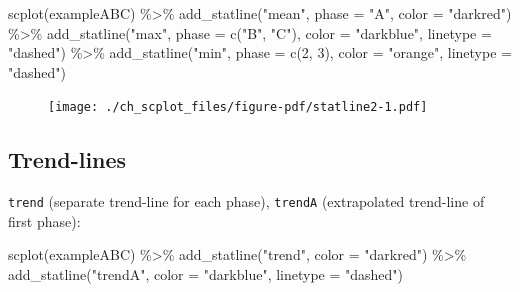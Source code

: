 \documentclass[
  letterpaper,
  DIV=11,
  numbers=noendperiod]{scrreprt}
\newenvironment{Shaded}{\begin{snugshade}}{\end{snugshade}}
\newcommand{\AttributeTok}[1]{\textcolor[rgb]{0.40,0.45,0.13}{#1}}
\newcommand{\DecValTok}[1]{\textcolor[rgb]{0.68,0.00,0.00}{#1}}
\newcommand{\FunctionTok}[1]{\textcolor[rgb]{0.28,0.35,0.67}{#1}}
\newcommand{\NormalTok}[1]{\textcolor[rgb]{0.00,0.23,0.31}{#1}}
\newcommand{\SpecialCharTok}[1]{\textcolor[rgb]{0.37,0.37,0.37}{#1}}
\newcommand{\StringTok}[1]{\textcolor[rgb]{0.13,0.47,0.30}{#1}}
\begin{document}
\begin{Shaded}
\begin{Highlighting}[]
\FunctionTok{scplot}\NormalTok{(exampleABC) }\SpecialCharTok{\%\textgreater{}\%}
  \FunctionTok{add\_statline}\NormalTok{(}\StringTok{"mean"}\NormalTok{, }\AttributeTok{phase =} \StringTok{"A"}\NormalTok{, }\AttributeTok{color =} \StringTok{"darkred"}\NormalTok{) }\SpecialCharTok{\%\textgreater{}\%}
  \FunctionTok{add\_statline}\NormalTok{(}\StringTok{"max"}\NormalTok{, }\AttributeTok{phase =} \FunctionTok{c}\NormalTok{(}\StringTok{"B"}\NormalTok{, }\StringTok{"C"}\NormalTok{), }\AttributeTok{color =} \StringTok{"darkblue"}\NormalTok{, }\AttributeTok{linetype =} \StringTok{"dashed"}\NormalTok{) }\SpecialCharTok{\%\textgreater{}\%}
  \FunctionTok{add\_statline}\NormalTok{(}\StringTok{"min"}\NormalTok{, }\AttributeTok{phase =} \FunctionTok{c}\NormalTok{(}\DecValTok{2}\NormalTok{, }\DecValTok{3}\NormalTok{), }\AttributeTok{color =} \StringTok{"orange"}\NormalTok{, }\AttributeTok{linetype =} \StringTok{"dashed"}\NormalTok{)}
\end{Highlighting}
\end{Shaded}

\begin{figure}[H]

{\centering \texttt{[image: ./ch\_scplot\_files/figure-pdf/statline2-1.pdf]}

}

\end{figure}

\hypertarget{trend-lines}{%
\subsection{Trend-lines}\label{trend-lines}}

\texttt{trend} (separate trend-line for each phase), \texttt{trendA}
(extrapolated trend-line of first phase):

\begin{Shaded}
\begin{Highlighting}[]
\FunctionTok{scplot}\NormalTok{(exampleABC) }\SpecialCharTok{\%\textgreater{}\%}
  \FunctionTok{add\_statline}\NormalTok{(}\StringTok{"trend"}\NormalTok{, }\AttributeTok{color =} \StringTok{"darkred"}\NormalTok{) }\SpecialCharTok{\%\textgreater{}\%}
  \FunctionTok{add\_statline}\NormalTok{(}\StringTok{"trendA"}\NormalTok{, }\AttributeTok{color =} \StringTok{"darkblue"}\NormalTok{, }\AttributeTok{linetype =} \StringTok{"dashed"}\NormalTok{)}
\end{Highlighting}
\end{Shaded}
\end{document}

